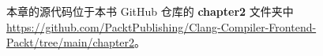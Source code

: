 
本章的源代码位于本书 GitHub 仓库的 \textbf{chapter2} 文件夹中 \url{https://github.com/PacktPublishing/Clang-Compiler-Frontend-Packt/tree/main/chapter2}。
